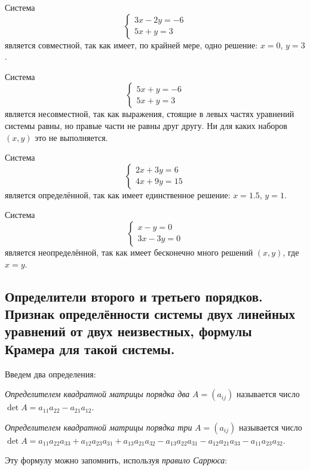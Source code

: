 \documentclass[a4paper, 12pt]{article}
\begin{document}
Система
\[\begin{cases}
3x - 2y = -6\\
5x + y = 3
\end{cases}\]
является совместной, так как имеет, по крайней мере, одно решение: $x = 0$, $y = 3$.

Система
\[\begin{cases}
5x + y = -6\\
5x + y = 3
\end{cases}\]
является несовместной, так как выражения, стоящие в левых частях уравнений системы равны, но правые части не равны друг другу. Ни для каких наборов $(x, y)$ это не выполняется.

Система
\[\begin{cases}
2x + 3y = 6\\
4x + 9y = 15
\end{cases}\]
является определённой, так как имеет единственное решение: $x = 1.5$, $y = 1$.

Система
\[\begin{cases}
x - y = 0\\
3x - 3y = 0
\end{cases}\]
является неопределённой, так как имеет бесконечно много решений $(x, y)$, где $x = y$.

\subsection{Определители второго и третьего порядков. Признак определённости системы двух линейных уравнений от двух неизвестных, формулы Крамера для такой системы.}
Введем два определения:

\textit{Определителем квадратной матрицы порядка два} $A = (a_{ij})$ называется число $\det A = a_{11}a_{22} - a_{21}a_{12}$.

\textit{Определителем квадратной матрицы порядка три} $A = (a_{ij})$ называется число $\det A =  a_{11} a_{22} a_{33} + a_{12} a_{23} a_{31} + a_{13} a_{21} a_{32} - a_{13} a_{22} a_{31} - a_{12} a_{21} a_{33} - a_{11} a_{23} a_{32}$.

Эту формулу можно запомнить, используя \textit{правило Саррюса}:
\end{document}
